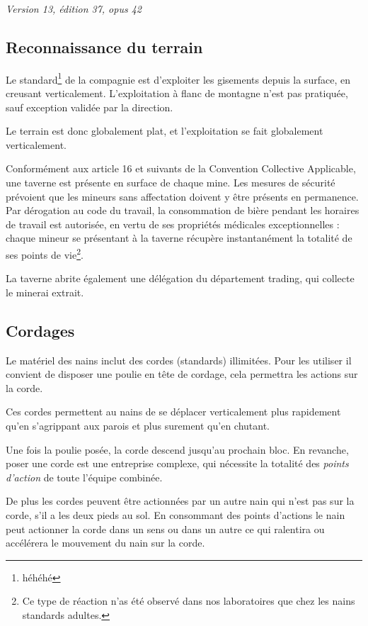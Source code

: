   \textit{Version 13, édition 37, opus 42}

\subsection{Reconnaissance du terrain}

  Le standard\footnote{héhéhé} de la compagnie est d'exploiter les gisements
  depuis la surface, en creusant verticalement. L'exploitation à flanc de
  montagne n'est pas pratiquée, sauf exception validée par la direction.

  Le terrain est donc globalement plat, et l'exploitation se fait globalement
  verticalement.

  Conformément aux article 16 et suivants de la Convention Collective
  Applicable, une taverne est présente en surface de chaque mine. Les mesures
  de sécurité prévoient que les mineurs sans affectation doivent y être
  présents en permanence. Par dérogation au code du travail, la consommation de
  bière pendant les horaires de travail est autorisée, en vertu de ses
  propriétés médicales exceptionnelles : chaque mineur se présentant à la
  taverne récupère instantanément la totalité de ses points de vie\footnote{Ce
  type de réaction n'as été observé dans nos laboratoires que chez les nains
  standards adultes.}.

  La taverne abrite également une délégation du département trading, qui
  collecte le minerai extrait.

\subsection{Cordages}

  Le matériel des nains inclut des cordes (standards) illimitées. Pour les
  utiliser il convient de disposer une poulie en tête de cordage, cela
  permettra les actions sur la corde.

  Ces cordes permettent au nains de se déplacer verticalement plus rapidement
  qu'en s'agrippant aux parois et plus surement qu'en chutant.

  Une fois la poulie posée, la corde descend jusqu'au prochain bloc. En
  revanche, poser une corde est une entreprise complexe, qui nécessite la
  totalité des \textit{points d'action} de toute l'équipe combinée.

  De plus les cordes peuvent être actionnées par un autre nain qui n'est pas
  sur la corde, s'il a les deux pieds au sol. En consommant des points
  d'actions le nain peut actionner la corde dans un sens ou dans un autre ce
  qui ralentira ou accélérera le mouvement du nain sur la corde.

